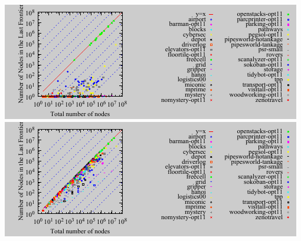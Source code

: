 \includegraphics{tables/aaai16-frontier/aaai16-lmcut_frontier-front-vs-expanded.pdf}
\includegraphics{tables/aaai16-frontier/aaai16-lmcut_frontier_noh-front-vs-expanded.pdf}
